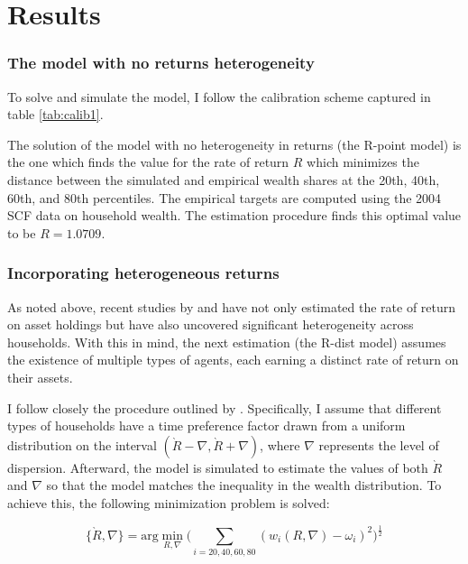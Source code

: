 
\section{Results}\notinsubfile{\label{sec:results}}

\subsubsection{The model with no returns heterogeneity}

\par To solve and simulate the model, I follow the calibration scheme captured in table \ref{tab:calib1}.
\unskip

\par The solution of the model with no heterogeneity in returns (the R-point model) is the one which finds the value for the rate of return $R$ which minimizes the distance between the simulated and empirical wealth shares at the 20th, 40th, 60th, and 80th percentiles. The empirical targets are computed using the 2004 SCF data on household wealth. The estimation procedure finds this optimal value to be $R = 1.0709$.

\subsubsection{Incorporating heterogeneous returns}

\par As noted above, recent studies by \cite{aflgdmlp20} and \cite{lblcps18} have not only estimated the rate of return on asset holdings but have also uncovered significant heterogeneity across households. With this in mind, the next estimation (the R-dist model) assumes the existence of multiple types of agents, each earning a distinct rate of return on their assets.

\par I follow closely the procedure outlined by \cite{cstw2017}. Specifically, I assume that different types of households have a time preference factor drawn from a uniform distribution on the interval $(\grave{R} - \nabla, \grave{R} + \nabla)$, where $\nabla$ represents the level of dispersion. Afterward, the model is simulated to estimate the values of both $\grave{R}$ and $\nabla$ so that the model matches the inequality in the wealth distribution. To achieve this, the following minimization problem is solved:

$$ \{\grave{R}, \nabla\} = \text{arg}\min_{R, \nabla} \bigg( \sum_{i=20, 40, 60, 80} (w_{i}(R, \nabla)-\omega_i )^{2} \bigg)^{\frac{1}{2}} $$

